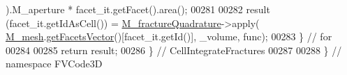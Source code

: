 \begin{DoxyCode}
      ).M\_aperture * facet\_it.getFacet().area();
00281 
00282         result (facet\_it.getIdAsCell()) = \hyperlink{classFVCode3D_1_1Quadrature_afc75e45ee2a0a8be3cd39f93c2ef0b7e}{M\_fractureQuadrature}->apply(
      \hyperlink{classFVCode3D_1_1Quadrature_abaa2519ea32065df30242bd5f5cb2d01}{M\_mesh}.\hyperlink{classFVCode3D_1_1Rigid__Mesh_a6d3cdd4ef8a5225599953179d5302636}{getFacetsVector}()[facet\_it.getId()], \_volume, func);
00283     \} \textcolor{comment}{// for}
00284 
00285     \textcolor{keywordflow}{return} result;
00286 \} \textcolor{comment}{// CellIntegrateFractures}
00287 
00288 \} \textcolor{comment}{// namespace FVCode3D}
\end{DoxyCode}
